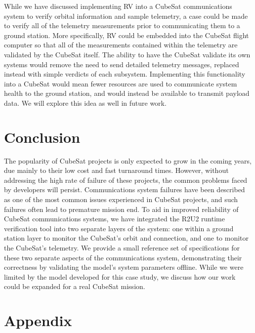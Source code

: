 \documentclass[conf]{new-aiaa}
\begin{document}
While we have discussed implementing RV into a CubeSat communications system to verify orbital information and sample telemetry, a case could be made to verify all of the telemetry measurements prior to communicating them to a ground station. More specifically, RV could be embedded into the CubeSat flight computer so that all of the measurements contained within the telemetry are validated by the CubeSat itself. The ability to have the CubeSat validate its own systems would remove the need to send detailed telemetry messages, replaced instead with simple verdicts of each subsystem. Implementing this functionality into a CubeSat would mean fewer resources are used to communicate system health to the ground station, and would instead be available to transmit payload data. We will explore this idea as well in future work.


\section{Conclusion}

The popularity of CubeSat projects is only expected to grow in the coming years, due mainly to their low cost and fast turnaround times. However, without addressing the high rate of failure of these projects, the common problems faced by developers will persist. Communications system failures have been described as one of the most common issues experienced in CubeSat projects, and such failures often lead to premature mission end. To aid in improved reliability of CubeSat communications systems, we have integrated the R2U2 runtime verification tool into two separate layers of the system: one within a ground station layer to monitor the CubeSat's orbit and connection, and one to monitor the CubeSat's telemetry. We provide a small reference set of specifications for these two separate aspects of the communications system, demonstrating their correctness by validating the model's system parameters offline. While we were limited by the model developed for this case study, we discuss how our work could be expanded for a real CubeSat mission.



\newpage
\section*{Appendix}

\end{document}
